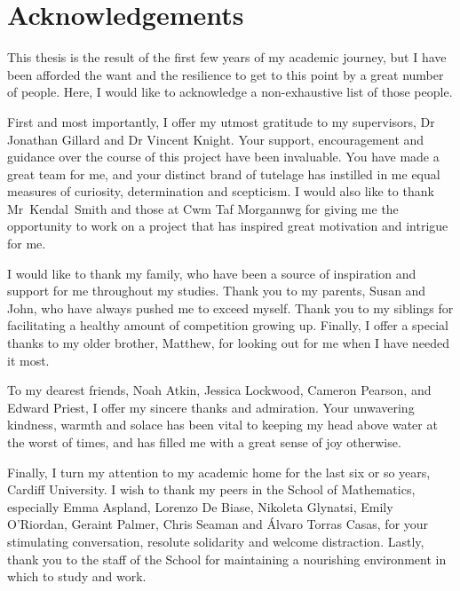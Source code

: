 \chapter*{Acknowledgements}

This thesis is the result of the first few years of my academic journey, but I
have been afforded the want and the resilience to get to this point by a great
number of people. Here, I would like to acknowledge a non-exhaustive list of
those people.

First and most importantly, I offer my utmost gratitude to my supervisors, Dr
Jonathan Gillard and Dr Vincent Knight. Your support, encouragement and guidance
over the course of this project have been invaluable. You have made a great team
for me, and your distinct brand of tutelage has instilled in me equal measures
of curiosity, determination and scepticism. I would also like to thank
Mr~Kendal~Smith and those at Cwm Taf Morgannwg for giving me the opportunity to
work on a project that has inspired great motivation and intrigue for me.

I would like to thank my family, who have been a source of inspiration and
support for me throughout my studies. Thank you to my parents, Susan and John,
who have always pushed me to exceed myself. Thank you to my siblings for
facilitating a healthy amount of competition growing up. Finally, I offer a
special thanks to my older brother, Matthew, for looking out for me when I have
needed it most.

To my dearest friends, Noah Atkin, Jessica Lockwood, Cameron Pearson, and Edward
Priest, I offer my sincere thanks and admiration. Your unwavering kindness,
warmth and solace has been vital to keeping my head above water at the worst of
times, and has filled me with a great sense of joy otherwise.

Finally, I turn my attention to my academic home for the last six or so years,
Cardiff University. I wish to thank my peers in the School of Mathematics,
especially Emma Aspland, Lorenzo De Biase, Nikoleta Glynatsi, Emily O'Riordan,
Geraint Palmer, Chris Seaman and \'{A}lvaro Torras Casas, for your stimulating
conversation, resolute solidarity and welcome distraction. Lastly, thank you to
the staff of the School for maintaining a nourishing environment in which to
study and work.
